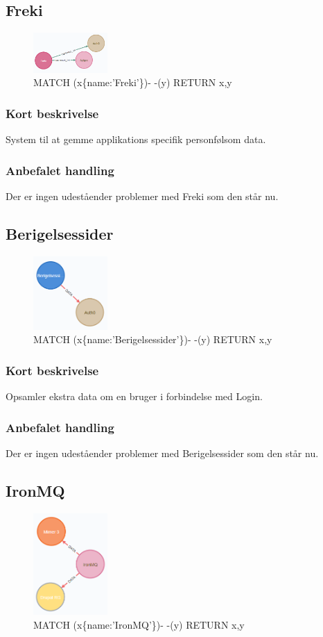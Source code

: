 \documentclass{article}
\begin{document}
\subsection{Freki}
\begin{figure}[h]
\includegraphics[width=80pt]{Freki.PNG}
\caption{MATCH (x\{name:'Freki'\})- -(y) RETURN x,y}
\end{figure}
\subsubsection{Kort beskrivelse}
System til at gemme applikations specifik personfølsom data.
\subsubsection{Anbefalet handling}
Der er ingen udeståender problemer med Freki som den står nu.



\subsection{Berigelsessider}
\begin{figure}[h]
\includegraphics[width=80pt]{Berigelsessider.PNG}
\caption{MATCH (x\{name:'Berigelsessider'\})- -(y) RETURN x,y}
\end{figure}
\subsubsection{Kort beskrivelse}
Opsamler ekstra data om en bruger i forbindelse med Login.
\subsubsection{Anbefalet handling}
Der er ingen udeståender problemer med Berigelsessider som den står nu.



\subsection{IronMQ}
\begin{figure}[h]
\includegraphics[width=80pt]{IronMQ.PNG}
\caption{MATCH (x\{name:'IronMQ'\})- -(y) RETURN x,y}
\end{figure}
\end{document}
